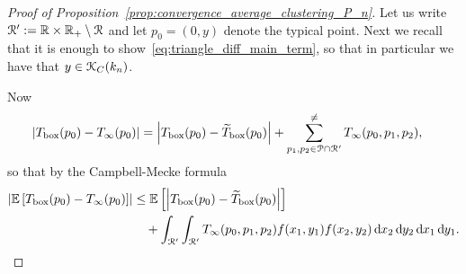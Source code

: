\begin{proof}[Proof of Proposition~\ref{prop:convergence_average_clustering_P_n}]
Let us write ${\mathcal R}^\prime := {\mathbb R} \times {\ensuremath{\mathbb R}}_+ \setminus {\mathcal R}$ and let $p_0 = (0,y)$ denote the typical point. Next we recall that it is enough to show~\eqref{eq:triangle_diff_main_term}, so that in particular we have that $y \in {\mathcal K}_{C}(k_n)$.

Now
\begin{align*}
	\left|T_{\text{box}}(p_0) - T_{\infty}(p_0)\right| 
	&= \left|T_{\text{box}}(p_0) - \widetilde{T}_{\text{box}}(p_0)\right| 
		+ \sum_{p_1, p_2 \in {\mathcal P} \cap {\mathcal R}^\prime}^{\ne} T_{\infty}(p_0,p_1,p_2),
\end{align*}
so that by the Campbell-Mecke formula
\begin{align*}
	\left|\mathbb{E}\left[T_{\text{box}}(p_0) - T_{\infty}(p_0)\right]\right|
	&\le \mathbb{E}\left[\left|T_{\text{box}}(p_0) - \widetilde{T}_{\text{box}}(p_0)\right|\right]\\
	&\hspace{10pt}+ \int_{{\mathcal R}^\prime}\int_{{\mathcal R}^\prime} T_{\infty}(p_0,p_1,p_2) f(x_1,y_1) f(x_2,y_2)
		\operatorname{\mathrm{d}\hspace{-2pt}} x_2 \operatorname{\mathrm{d}\hspace{-2pt}} y_2 \operatorname{\mathrm{d}\hspace{-2pt}} x_1 \operatorname{\mathrm{d}\hspace{-2pt}} y_1. 
\end{align*}


\end{proof}

